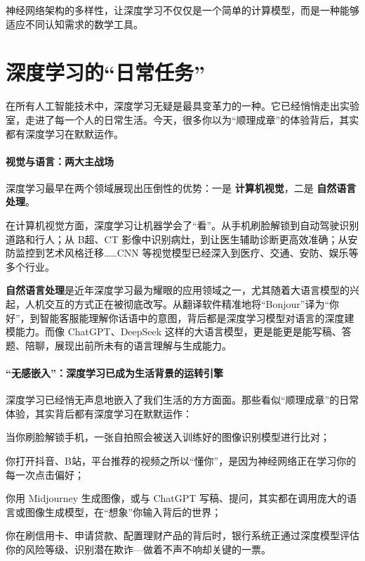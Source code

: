 
神经网络架构的多样性，让深度学习不仅仅是一个简单的计算模型，而是一种能够适应不同认知需求的数学工具。

\section{深度学习的“日常任务”}
在所有人工智能技术中，深度学习无疑是最具变革力的一种。它已经悄悄走出实验室，走进了每一个人的日常生活。今天，很多你以为“顺理成章”的体验背后，其实都有深度学习在默默运作。

\paragraph{视觉与语言：两大主战场}
深度学习最早在两个领域展现出压倒性的优势：一是 {\bf 计算机视觉}，二是 {\bf 自然语言处理}。

在计算机视觉方面，深度学习让机器学会了“看”。从手机刷脸解锁到自动驾驶识别道路和行人；从 B超、CT 影像中识别病灶，到让医生辅助诊断更高效准确；从安防监控到艺术风格迁移……CNN 等视觉模型已经深入到医疗、交通、安防、娱乐等多个行业。

 {\bf 自然语言处理}是近年深度学习最为耀眼的应用领域之一，尤其随着大语言模型的兴起，人机交互的方式正在被彻底改写。从翻译软件精准地将“Bonjour”译为“你好”，到智能客服能理解你话语中的意图，背后都是深度学习模型对语言的深度建模能力。而像 ChatGPT、DeepSeek 这样的大语言模型，更是能更是能写稿、答题、陪聊，展现出前所未有的语言理解与生成能力。
 
 \paragraph{“无感嵌入”：深度学习已成为生活背景的运转引擎}
深度学习已经悄无声息地嵌入了我们生活的方方面面。那些看似“顺理成章”的日常体验，其实背后都有深度学习在默默运作：

当你刷脸解锁手机，一张自拍照会被送入训练好的图像识别模型进行比对；

你打开抖音、B站，平台推荐的视频之所以“懂你”，是因为神经网络正在学习你的每一次点击偏好；

你用 Midjourney 生成图像，或与 ChatGPT 写稿、提问，其实都在调用庞大的语言或图像生成模型，在“想象”你输入背后的世界；

你在刷信用卡、申请贷款、配置理财产品的背后时，银行系统正通过深度模型评估你的风险等级、识别潜在欺诈---做着不声不响却关键的一票。

